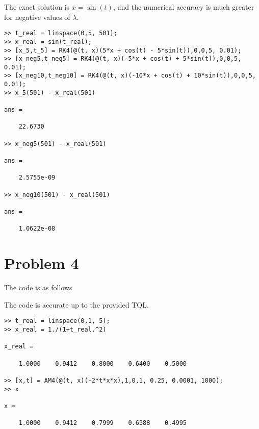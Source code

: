 \documentclass{article}
\begin{document}
The exact solution is $x= \sin(t)$, and the numerical accuracy is much greater for negative values of $\lambda$.
\begin{verbatim}
>> t_real = linspace(0,5, 501);
>> x_real = sin(t_real);
>> [x_5,t_5] = RK4(@(t, x)(5*x + cos(t) - 5*sin(t)),0,0,5, 0.01);
>> [x_neg5,t_neg5] = RK4(@(t, x)(-5*x + cos(t) + 5*sin(t)),0,0,5, 0.01);
>> [x_neg10,t_neg10] = RK4(@(t, x)(-10*x + cos(t) + 10*sin(t)),0,0,5, 0.01);
>> x_5(501) - x_real(501)

ans =

	22.6730

>> x_neg5(501) - x_real(501)

ans =

	2.5755e-09

>> x_neg10(501) - x_real(501)

ans =

	1.0622e-08
\end{verbatim}
\newpage

\section*{Problem 4}
The code is as follows


The code is accurate up to the provided TOL.
\begin{verbatim}
>> t_real = linspace(0,1, 5);
>> x_real = 1./(1+t_real.^2)

x_real =

	1.0000    0.9412    0.8000    0.6400    0.5000

>> [x,t] = AM4(@(t, x)(-2*t*x*x),1,0,1, 0.25, 0.0001, 1000);
>> x

x =

	1.0000    0.9412    0.7999    0.6388    0.4995
\end{verbatim}
\end{document}
